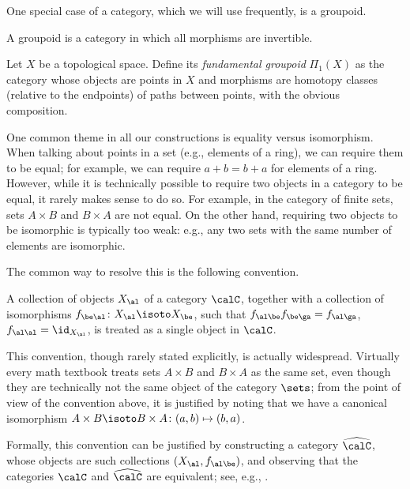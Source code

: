 One special case of a category, which we will use frequently, is a groupoid.
\begin{definition}
  A groupoid is a category in which all morphisms are invertible.
\end{definition}
\begin{example}\label{x:fundamental-groupoid}
  Let $X$ be a topological space. Define its \emph{fundamental
  groupoid} $\Pi_1(X)$ as the category whose objects
  are points in $X$ and morphisms are homotopy classes (relative to the
  endpoints) of paths between points, with the obvious composition.
\end{example}

One common theme in all our constructions is equality versus isomorphism. When
talking about points in a set (e.g., elements of a ring), we can require them to
be equal; for example, we can require $a+b=b+a$ for elements of a ring. However,
while it is technically possible to require two objects in a category to be
equal, it rarely makes sense to do so. For example, in the category of finite
sets, sets $A\times B$ and $B\times A$ are not equal. On the other hand,
requiring two objects to be isomorphic is typically too weak: e.g., any two sets
with the same number of elements are isomorphic.

The common way to resolve this is the following convention.
\begin{convention}\label{conv:canonical}
  A collection of objects $X_\al$ of a category $\calC$, together with a
  collection of isomorphisms $f_{\be\al}\colon X_\al \isoto X_\be$, such that
  $f_{\al\be}f_{\be\ga}=f_{\al\ga}$, $f_{\al\al}=\id_{X_\al}$, is treated as a
  single object in $\calC$.
\end{convention}
This convention, though rarely stated explicitly, is actually widespread.
Virtually every math textbook treats sets $A\times B$ and $B\times A$ as the
same set, even though they are technically not the same object of the category
$\sets$; from the point of view of the convention above, it is justified by
noting that we have a canonical isomorphism $A\times B\isoto B\times A\colon
(a,b)\mapsto (b,a)$.

Formally, this convention can be justified by constructing a category
$\widehat\calC$, whose objects are such collections $(X_\al, f_{\al\be})$, and
observing that the categories $\calC$ and $\widehat\calC$ are equivalent; see,
e.g., \cite[Lemma 1.1.12]{bakalov-kirillov}.


